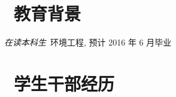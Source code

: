 \documentclass{resume}
\begin{document}



 
\section{\faGraduationCap\  教育背景}
\textit{在读本科生}\ 环境工程, 预计 2016 年 6 月毕业


\section{\faUsers\ 学生干部经历}
\end{document}
